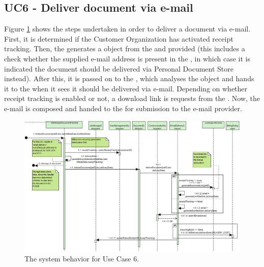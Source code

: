 \subsection{UC6 - Deliver document via e-mail}
Figure \ref{fig:seq_uc6} shows the steps undertaken in order to deliver a document via e-mail. First, it is determined if the Customer Organization has activated receipt tracking. Then, the  generates a  object from the  and  provided (this includes a check whether the supplied e-mail address is present in the , in which case it is indicated the document should be delivered via Personal Document Store instead). After this, it is passed on to the , which analyses the  object and hands it to the  when it sees it should be delivered via e-mail. Depending on whether receipt tracking is enabled or not, a download link is requests from the  . Now, the e-mail is composed and handed to the  for submission to the e-mail provider.

\begin{figure}[!htp]
    \centering
    \includegraphics[width=\textwidth]{figures/UC6 - Deliver document via e-mail.png}
    \caption{The system behavior for Use Case 6.
        }\label{fig:seq_uc6}
\end{figure}

